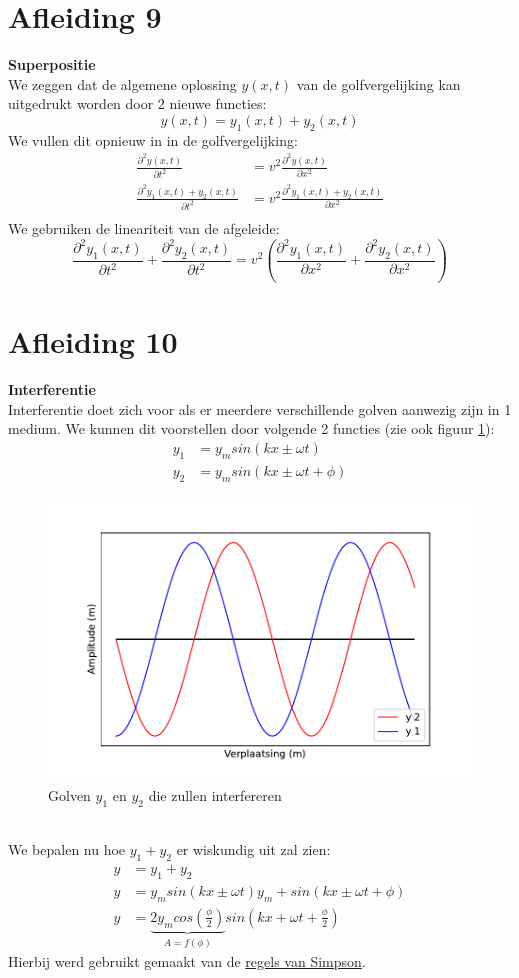 \documentclass[a4paper,kul]{kulakarticle} %
\begin{document}
\section{Afleiding 9}
\textbf{Superpositie}\\
We zeggen dat de algemene oplossing $y(x,t)$ van de golfvergelijking kan uitgedrukt worden door 2 nieuwe functies:
\begin{equation*}
	y(x,t) = y_1(x,t)+y_2(x,t)
\end{equation*}
We vullen dit opnieuw in in de golfvergelijking:
\begin{align*}
	\frac{\partial^2 y(x,t)}{\partial t^2} & = v^2 \frac{\partial^2 y(x,t)}{\partial x^2}\\
	\frac{\partial^2 y_1(x,t)+y_2(x,t)}{\partial t^2} & = v^2 \frac{\partial^2 y_1(x,t)+y_2(x,t)}{\partial x^2}\\
\end{align*}
We gebruiken de lineariteit van de afgeleide:
\begin{equation*}
	\frac{\partial^2 y_1(x,t)}{\partial t^2} +\frac{\partial^2 y_2(x,t)}{\partial t^2}  = v^2(\frac{\partial^2 y_1(x,t)}{\partial x^2}+\frac{\partial^2 y_2(x,t)}{\partial x^2})
\end{equation*}
\newpage
\section{Afleiding 10}
\textbf{Interferentie}\\
Interferentie doet zich voor als er meerdere verschillende golven aanwezig zijn in 1 medium. We kunnen dit voorstellen door volgende 2 functies (zie ook figuur \ref{fig:interferentie}):
\begin{align*}
	y_1 & = y_msin(kx\pm\omega t)\\
	y_2 & = y_msin(kx\pm\omega t +\phi)
\end{align*}
\begin{figure}[h]
	\centering
	\includegraphics[width=0.5\linewidth]{Interferentie}
	\caption[Interferentie]{Golven $y_1$ en $y_2$ die zullen interfereren}
	\label{fig:interferentie}
\end{figure}\\
We bepalen nu hoe $y_1+y_2$ er wiskundig uit zal zien:
\begin{align*}
	y & = y_1+y_2\\
	y & = y_msin(kx\pm\omega t) y_m+sin(kx\pm\omega t +\phi)\\
	y & = \underbrace{2y_mcos(\frac{\phi}{2})}_{A = f(\phi)}sin(kx+\omega t+\frac{\phi}{2})
\end{align*}
Hierbij werd gebruikt gemaakt van de \href{https://nl.wikipedia.org/wiki/Lijst_van_goniometrische_gelijkheden#Som-naar-product-identiteiten_(regels_van_Simpson)}{regels van Simpson}.
\end{document}
